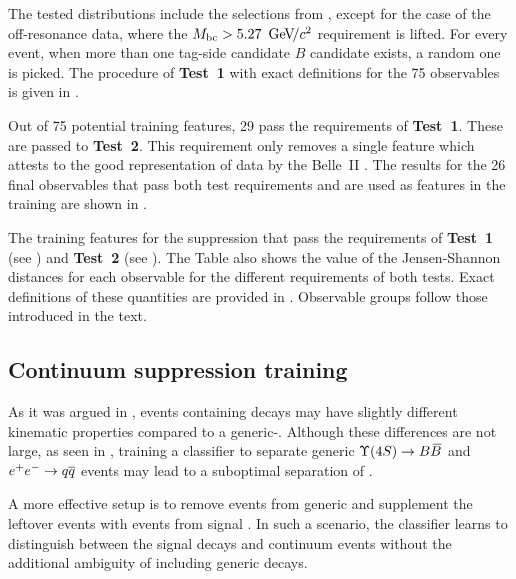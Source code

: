 The tested distributions include the selections from , except for the case of the off-resonance data, where the ${M_{\mathrm{bc}}}>5.27~{\mathrm{\,Ge\kern -0.1em V\!/}c^2}$ requirement is lifted.
For every event, when more than one tag-side candidate $B$ candidate exists, a random one is picked.
The procedure of \textbf{Test~1} with exact definitions for the 75 observables is given in .

Out of 75 potential training features, 29 pass the requirements of \textbf{Test~1}.
These are passed to \textbf{Test~2}.
This requirement only removes a single feature which attests to the good representation of data by the Belle~II \MC.
The results for the 26 final observables that pass both test requirements and are used as features in the \BDT training
are shown in .

\begin{table}[htbp!]
    \centering
    \caption{\label{tab:passing_test1}The training features for the \epem\ra\qqbar suppression
    that pass the requirements of \textbf{Test~1} (see ) and \textbf{Test~2} (see ).
    The Table also shows the value of the Jensen-Shannon distances for each observable for the different requirements of both tests.
    Exact definitions of these quantities are provided in .
    Observable groups follow those introduced in the text.
    }   
    
\end{table}

\subsection{Continuum suppression training}\label{sec:continuum_training}

As it was argued in , events containing \BtoXsgamma decays may have slightly different kinematic properties compared to a generic-\BB.
Although these differences are not large, as seen in , training a classifier to separate generic \mbox{$\FourS\ra\BB$} and \mbox{$e^+e^-\rightarrow q\overline q$} events may lead to a suboptimal separation of \BtoXsgamma.

A more effective setup is to remove \BB events from generic \MC and supplement the leftover events with \BtoXsgamma events from signal \MC. 
In such a scenario, the classifier learns to distinguish between the signal decays and continuum events without the additional ambiguity of including generic \BB decays.

